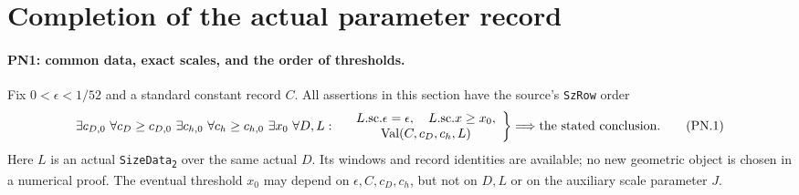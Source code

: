 \section{Completion of the actual parameter record}
\label{sec:parameter-completion}


\paragraph{PN1: common data, exact scales, and the order of thresholds.}
Fix $0<\epsilon<1/52$ and a standard constant record $C$. All assertions
in this section have the source's \texttt{SzRow} order
\[
 \exists c_{D,0}\ \forall c_D\geq c_{D,0}\
 \exists c_{h,0}\ \forall c_h\geq c_{h,0}\
 \exists x_0\ \forall D,L:\quad
 \left.
 \begin{array}{c}
 L.\mathrm{sc}.\epsilon=\epsilon,\quad L.\mathrm{sc}.x\geq x_0,\\
 \operatorname{Val}(C,c_D,c_h,L)
 \end{array}\right\}\Longrightarrow\hbox{the stated conclusion}.
                                                               \tag{PN.1}
\]
Here $L$ is an actual \texttt{SizeData\textsubscript{2}} over the same
actual $D$. Its windows and record identities are available; no new
geometric object is chosen in a numerical proof. The eventual threshold
$x_0$ may depend on $\epsilon,C,c_D,c_h$, but not on $D,L$ or on the
auxiliary scale parameter $J$.


